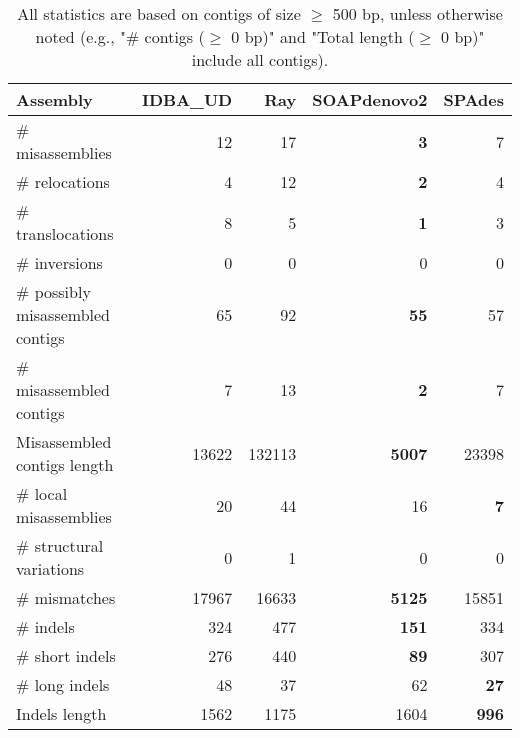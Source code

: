 \documentclass[12pt,a4paper]{article}
\begin{document}
\begin{table}[ht]
\begin{center}
\caption{All statistics are based on contigs of size $\geq$ 500 bp, unless otherwise noted (e.g., "\# contigs ($\geq$ 0 bp)" and "Total length ($\geq$ 0 bp)" include all contigs).}
\begin{tabular}{|l*{4}{|r}|}
\hline
Assembly & IDBA\_UD & Ray & SOAPdenovo2 & SPAdes \\ \hline
\# misassemblies & 12 & 17 & {\bf 3} & 7 \\ \hline
\hspace{5mm}\# relocations & 4 & 12 & {\bf 2} & 4 \\ \hline
\hspace{5mm}\# translocations & 8 & 5 & {\bf 1} & 3 \\ \hline
\hspace{5mm}\# inversions & 0 & 0 & 0 & 0 \\ \hline
\# possibly misassembled contigs & 65 & 92 & {\bf 55} & 57 \\ \hline
\# misassembled contigs & 7 & 13 & {\bf 2} & 7 \\ \hline
Misassembled contigs length & 13622 & 132113 & {\bf 5007} & 23398 \\ \hline
\# local misassemblies & 20 & 44 & 16 & {\bf 7} \\ \hline
\# structural variations & 0 & 1 & 0 & 0 \\ \hline
\# mismatches & 17967 & 16633 & {\bf 5125} & 15851 \\ \hline
\# indels & 324 & 477 & {\bf 151} & 334 \\ \hline
\hspace{5mm}\# short indels & 276 & 440 & {\bf 89} & 307 \\ \hline
\hspace{5mm}\# long indels & 48 & 37 & 62 & {\bf 27} \\ \hline
Indels length & 1562 & 1175 & 1604 & {\bf 996} \\ \hline
\end{tabular}
\end{center}
\end{table}
\end{document}
